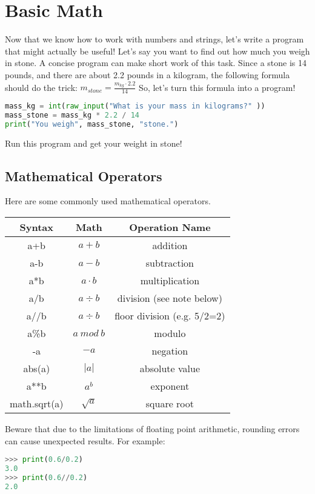 \section{Basic Math}
Now that we know how to work with numbers and strings, let's write a program
that might actually be useful! Let's say you want to find out how much you weigh
in stone. A concise program can make short work of this task. Since a stone is
14 pounds, and there are about 2.2 pounds in a kilogram, the following formula
should do the trick: $m_{stone} = \frac{m_{kg} \cdot 2.2}{14}$
So, let's turn this formula into a program!
\lstset{basicstyle=\scriptsize, numbers=left, captionpos=b, tabsize=4}
\begin{lstlisting}[caption=Wight in Stone,language={Python},
xleftmargin=15pt, label=lst:wightinstone]
mass_kg = int(raw_input("What is your mass in kilograms?" ))
mass_stone = mass_kg * 2.2 / 14
print("You weigh", mass_stone, "stone.")
\end{lstlisting}
Run this program and get your weight in stone! 

\subsection{Mathematical Operators}
Here are some commonly used mathematical operators.
\begin{tabular}{c c c}
Syntax&	Math& Operation Name\\
\hline
a+b & $a+b$ &addition\\
a-b & $a-b$ &subtraction\\
a*b & $a \cdot b$ & multiplication\\
a/b & $a \div b$ & division (see note below)\\
a//b& $a \div b$ & floor division (e.g. 5/2=2)\\
a\%b& $a\ mod\ b$ & modulo\\
-a& $-a$ &	negation\\
abs(a) &$|a|$ &	absolute value\\
a**b & $a^b$ & exponent\\
math.sqrt(a)& $\sqrt{a}$ &square root \\
\end{tabular}

Beware that due to the limitations of floating point arithmetic, rounding errors
can cause unexpected results. For example:
\lstset{basicstyle=\scriptsize, numbers=left, captionpos=b, tabsize=4}
\begin{lstlisting}[caption=Basic Math 1,language={Python},
xleftmargin=15pt, label=lst:basicmath1]
>>> print(0.6/0.2)
3.0
>>> print(0.6//0.2)
2.0
\end{lstlisting}

